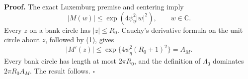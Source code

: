 \textbf{Proof.}
The exact Luxemburg premise and centering imply
\[
 |M(w)|\le\exp(4\psi_\eta^2|w|^2),\qquad w\in\mathbb C. \tag{1}
\]
Every \(z\) on a bank circle has \(|z|\le R_0\).  Cauchy's derivative formula on the unit circle about \(z\), followed by (1), gives
\[
 |M'(z)|\le\exp\{4\psi_\eta^2(R_0+1)^2\}=A_M. \tag{2}
\]
Every bank circle has length at most \(2\pi R_0\), and the definition of \(\Lambda_0\) dominates \(2\pi R_0A_M\).  The result follows. \(\square\)